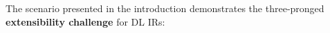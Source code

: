 The scenario presented in the introduction demonstrates the three-pronged \textbf{extensibility challenge}
  for DL IRs:
